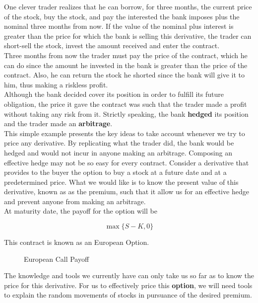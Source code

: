 \documentclass[11pt]{report}
\begin{document}
 One clever trader realizes that he can borrow, for three months, the current price of the stock, buy the stock, and pay the interested the bank imposes plus the nominal three months from now. If the value of the nominal plus interest is greater than the price for which the bank is selling this derivative, the trader can short-sell the stock, invest the amount received and enter the contract.\\
 
  Three months from now the trader must pay the price of the contract, which he can do since the amount he invested in the bank is greater than the price of the contract. Also, he can return the stock he shorted since the bank will give it to him, thus making a riskless profit.\\
 
Although the bank decided cover its position in order to fulfill its future obligation, the price it gave the contract was such that the trader made a profit without taking any risk from it. Strictly speaking, the bank \textbf{hedged} its position and the trader made an \textbf{arbitrage}.\\

This simple example presents the key ideas to take account whenever we try to price any derivative. By replicating what the trader did, the bank would be hedged and would not incur in anyone making an arbitrage. Composing an effective hedge may not be so easy for every contract. Consider a derivative that provides to the buyer the option to buy a stock at a future date and at a predetermined price. What we would like is to know the present value of this derivative, known as as the premium, such that it allow us for an effective hedge and prevent anyone from making an arbitrage.\\

At maturity date, the payoff for the option will be

\begin{equation}
	\max\{S-K, 0\}
\end{equation}

This contract is known as an European Option.

\begin{figure}[h]
	\centering
	
	\caption{European Call Payoff}
\end{figure}

The knowledge and tools we currently have can only take us so far as to know the price for this derivative. For us to effectively price this \textbf{option}, we will need tools to explain the random movements of stocks in pursuance of the desired premium.
\end{document}
